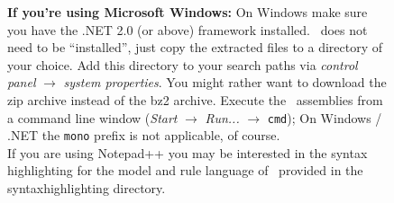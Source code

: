 \begin{figure}[htbp]
    \begin{note}
        {\bf If you're using Microsoft Windows:}
        On Windows make sure you have the .NET 2.0 (or above) framework installed.
        \GrG\ does not need to be ``installed'', just copy the extracted files to a directory of your choice.
        Add this directory to your search paths via \emph{control panel} $\rightarrow$ \emph{system properties}.
        You might rather want to download the zip archive instead of the bz2 archive.
        Execute the \GrG\ assemblies from a command line window (\emph{Start} $\rightarrow$ \emph{Run...} $\rightarrow$ \texttt{cmd}); On Windows / .NET the \texttt{mono} prefix is not applicable, of course.\\
        If you are using Notepad++ you may be interested in the syntax highlighting for the model and rule language of \GrG\ provided in the syntaxhighlighting directory.
    \end{note}
\end{figure}


